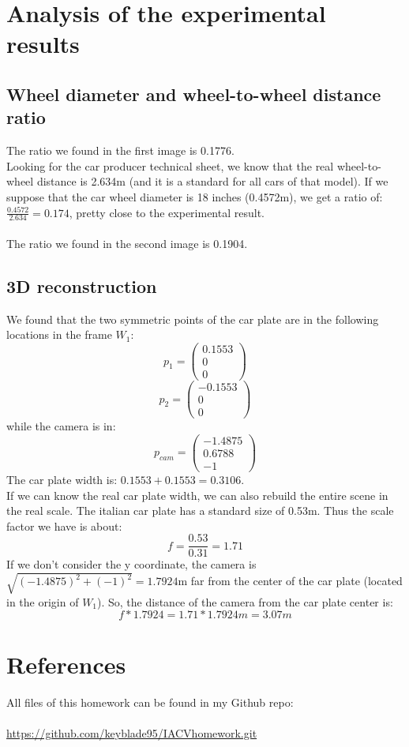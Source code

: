 \documentclass{article}
\begin{document}
\newpage
\section{Analysis of the experimental results}

\subsection{Wheel diameter and wheel-to-wheel distance ratio}
The ratio we found in the first image is 0.1776.
\\
Looking for the car producer technical sheet, we know that the real wheel-to-wheel distance is 2.634m (and it is a standard for all cars of that model). If we suppose that the car wheel diameter is 18 inches (0.4572m), we get a ratio of: $\frac{0.4572}{2.634} = 0.174$, pretty close to the experimental result.
\\
\\
The ratio we found in the second image is 0.1904.

\subsection{3D reconstruction}
We found that the two symmetric points of the car plate are in the following locations in the frame $W_1$:
$$ p_1 = \begin{pmatrix}
0.1553 \\ 0 \\ 0
\end{pmatrix}
$$
$$ p_2 = \begin{pmatrix}
-0.1553 \\ 0 \\ 0
\end{pmatrix}
$$
while the camera is in:
$$ p_{cam} = \begin{pmatrix}
-1.4875 \\ 0.6788 \\ -1
\end{pmatrix}
$$
The car plate width is: $0.1553 + 0.1553 = 0.3106$.\\
If we can know the real car plate width, we can also rebuild the entire scene in the real scale.
The italian car plate has a standard size of 0.53m. Thus the scale factor we have is about:
$$ f = \frac{0.53}{0.31} = 1.71 $$
If we don't consider the y coordinate, the camera is $\sqrt{(-1.4875)^2 + (-1)^2} = 1.7924$m far from the center of the car plate (located in the origin of $W_1$).
So, the distance of the camera from the car plate center is:\\
$$ f*1.7924 = 1.71*1.7924\textit{m} = 3.07 \textit{m}$$


\newpage
\section{References}
All files of this homework can be found in my Github repo: \\
\\
\url{https://github.com/keyblade95/IACVhomework.git}

\newpage


\end{document}
